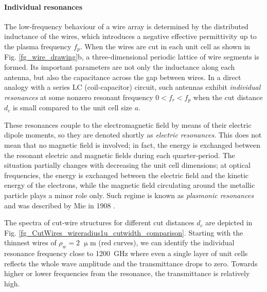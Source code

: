 \paragraph{Individual resonances}%
The low-frequency behaviour of a wire array is determined by the distributed inductance of the wires, which introduces a negative effective permittivity up to the plasma frequency $f_p$. When the wires are cut in each unit cell as shown in Fig. \ref{fg_wire_drawing}b, a three-dimensional periodic lattice of wire segments is formed. Its important parameters are not only the inductance along each antenna, but also the capacitance across the gap between wires. In a direct analogy with a series LC (coil-capacitor) circuit, such antennas exhibit \textit{individual resonances} at some nonzero resonant frequency $0<f_r<f_p$ when the cut distance  $d_c$ is small compared to the unit cell size $a$. 

These resonances couple to the electromagnetic field by means of their electric dipole moments, so they are denoted shortly as \textit{electric resonances}. This does not mean that no magnetic field is involved; in fact, the energy is exchanged between the resonant electric and magnetic fields during each quarter-period. The situation partially changes with decreasing the unit cell dimensions; at optical frequencies, the energy is exchanged between the electric field and the kinetic energy of the electrons, while the magnetic field circulating around the metallic particle plays a minor role only. Such regime is known as \textit{plasmonic resonances} and was described by Mie in 1908 \cite{mie1908beitrage}.

The spectra of cut-wire structures for different cut distances $d_c$ are depicted in Fig. \ref{fg_CutWires_wireradius1u_cutwidth_comparison}. Starting with the thinnest wires of $\rho_w = 2$ $\upmu$m (red curves), we can identify the individual resonance frequency close to  1200~GHz where even a single layer of unit cells reflects the whole wave amplitude and the transmittance drops to zero. Towards higher or lower frequencies from the resonance, the transmittance is relatively high.

